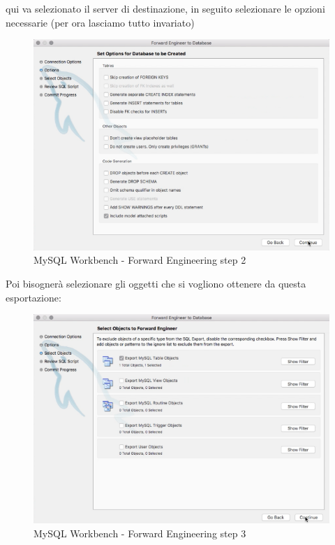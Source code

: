 qui va selezionato il server di destinazione, in seguito selezionare le opzioni necessarie (per ora lasciamo tutto invariato) 

\begin{center}
\begin{figure}[H]
\centering
\includegraphics[scale=0.8]{figures/mySQL_workbench_FE2.png}
\caption{MySQL Workbench - Forward Engineering step 2}
\end{figure}
\end{center}

Poi bisognerà selezionare gli oggetti che si vogliono ottenere da questa esportazione:

\begin{center}
\begin{figure}[H]
\centering
\includegraphics[scale=1]{figures/mySQL_workbench_FE3.png}
\caption{MySQL Workbench - Forward Engineering step 3}
\end{figure}
\end{center}

